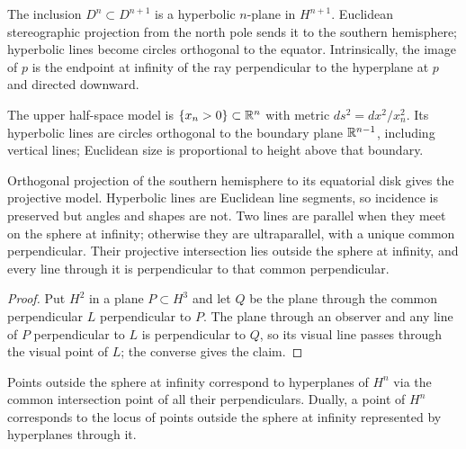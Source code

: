 \begin{definition}
\label{thurston-ch02-southern-hemisphere}
The inclusion $D^n\subset D^{n+1}$ is a hyperbolic $n$-plane in $H^{n+1}$. Euclidean stereographic projection from the north pole sends it to the southern hemisphere; hyperbolic lines become circles orthogonal to the equator. Intrinsically, the image of $p$ is the endpoint at infinity of the ray perpendicular to the hyperplane at $p$ and directed downward.
\end{definition}

\begin{definition}
\label{thurston-ch02-upper-half-space}
The upper half-space model is $\{x_n>0\}\subset\mathbb{R}^n$ with metric $ds^2=dx^2/x_n^2$. Its hyperbolic lines are circles orthogonal to the boundary plane $\mathbb{R}^{n-1}$, including vertical lines; Euclidean size is proportional to height above that boundary.
\end{definition}

\begin{definition}
\label{thurston-ch02-projective-model}
Orthogonal projection of the southern hemisphere to its equatorial disk gives the projective model. Hyperbolic lines are Euclidean line segments, so incidence is preserved but angles and shapes are not. Two lines are parallel when they meet on the sphere at infinity; otherwise they are ultraparallel, with a unique common perpendicular. Their projective intersection lies outside the sphere at infinity, and every line through it is perpendicular to that common perpendicular.
\end{definition}
\begin{proof}\sketch Put $H^2$ in a plane $P\subset H^3$ and let $Q$ be the plane through the common perpendicular $L$ perpendicular to $P$. The plane through an observer and any line of $P$ perpendicular to $L$ is perpendicular to $Q$, so its visual line passes through the visual point of $L$; the converse gives the claim.\end{proof}

\begin{proposition}
\label{thurston-ch02-projective-duality}
Points outside the sphere at infinity correspond to hyperplanes of $H^n$ via the common intersection point of all their perpendiculars. Dually, a point of $H^n$ corresponds to the locus of points outside the sphere at infinity represented by hyperplanes through it.
\end{proposition}

